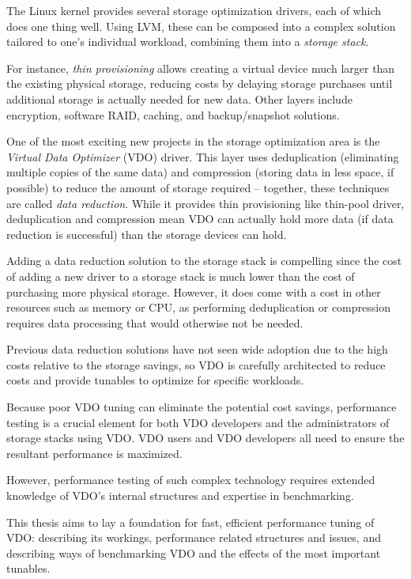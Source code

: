 \documentclass[
  color, %
  table, %
  lof,   %
  lot,   %
]{fithesis3}
\begin{document}
The Linux kernel provides several storage optimization drivers, each of which does one thing well. Using LVM, these can be composed into a complex solution tailored to one's individual workload, combining them into a \emph{storage stack}.

For instance, \emph{thin provisioning} allows creating a virtual device much larger than the existing physical storage, reducing costs by delaying storage purchases until additional storage is actually needed for new data. Other layers include encryption, software RAID, caching, and backup/snapshot solutions.

One of the most exciting new projects in the storage optimization area is the \emph{Virtual Data Optimizer} (VDO) driver. This layer uses deduplication (eliminating multiple copies of the same data) and compression (storing data in less space, if possible) to reduce the amount of storage required -- together, these techniques are called \emph{data reduction}. While it provides thin provisioning like thin-pool driver, deduplication and compression mean VDO can actually hold more data (if data reduction is successful) than the storage devices can hold.

Adding a data reduction solution to the storage stack is compelling since the cost of adding a new driver to a storage stack is much lower than the cost of purchasing more physical storage. However, it does come with a cost in other resources such as memory or CPU, as performing deduplication or compression requires data processing that would otherwise not be needed.

Previous data reduction solutions have not seen wide adoption due to the high costs relative to the storage savings, so VDO is carefully architected to reduce costs and provide tunables to optimize for specific workloads.

Because poor VDO tuning can eliminate the potential cost savings, performance testing is a crucial element for both VDO developers and
the administrators of storage stacks using VDO. VDO users and VDO developers all need to ensure the resultant performance is maximized.

However, performance testing of such complex technology requires extended knowledge of VDO's internal structures and expertise in benchmarking.

This thesis aims to lay a foundation for fast, efficient performance tuning of VDO: describing its workings, performance related structures and issues, and describing ways of benchmarking VDO and the effects of the most important tunables.
\end{document}
